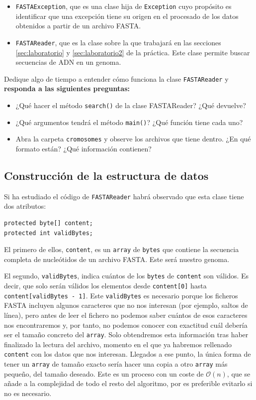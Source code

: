 \documentclass[10pt,a4paper,spanish]{article}
\newcommand{\code}[1]{\texttt{#1}}
\newcommand{\bigO}{\mathcal{O}}
\begin{document}
\begin{itemize}
    \item \code{FASTAException}, que es una clase hija de \code{Exception} cuyo propósito es identificar que una excepción tiene su origen en el procesado de los datos obtenidos a partir de un archivo FASTA.
    \item \code{FASTAReader}, que es la clase sobre la que trabajará en las secciones \ref{sec:laboratorio} y \ref{sec:laboratorio2} de la práctica. Este clase permite buscar secuencias de ADN en un genoma.
\end{itemize}

Dedique algo de tiempo a entender cómo funciona la clase \code{FASTAReader} y \textbf{responda a las siguientes preguntas:}

\begin{itemize}
    \item ¿Qué hacer el método \code{search()} de la clase {FASTAReader}? ¿Qué devuelve?
    \item ¿Qué argumentos tendrá el método \code{main()}? ¿Qué función tiene cada uno?
    \item Abra la carpeta \code{cromosomes} y observe los archivos que tiene dentro. ¿En qué formato están? ¿Qué información contienen?
\end{itemize}

\subsection{Construcción de la estructura de datos}

Si ha estudiado el código de \code{FASTAReader} habrá observado que esta clase tiene dos atributos:

\begin{verbatim}
protected byte[] content;
protected int validBytes;
\end{verbatim}

El primero de ellos, \code{content}, es un \code{array} de \code{bytes} que contiene la secuencia completa de nucleótidos de un archivo FASTA. Este será nuestro genoma.

El segundo, \code{validBytes}, indica cuántos de los \code{bytes} de \code{content} son válidos. Es decir, que solo serán válidos los elementos desde  \code{content[0]} hasta \code{content[validBytes - 1]}. Este \code{validBytes} es necesario porque los ficheros FASTA incluyen algunos caracteres que no nos interesan (por ejemplo, saltos de línea), pero antes de leer el fichero no podemos saber cuántos de esos caracteres nos encontraremos y, por tanto, no podemos conocer con exactitud cuál debería ser el tamaño concreto del \code{array}. Solo obtendremos esta información tras haber finalizado la lectura del archivo, momento en el que ya habremos rellenado \code{content} con los datos que nos interesan. Llegados a ese punto, la única forma de tener un \code{array} de tamaño exacto sería hacer una copia a otro \code{array} más pequeño, del tamaño deseado. Este es un proceso con un coste de $\bigO(n)$, que se añade a la complejidad de todo el resto del algoritmo, por es preferible evitarlo si no es necesario.
\end{document}
